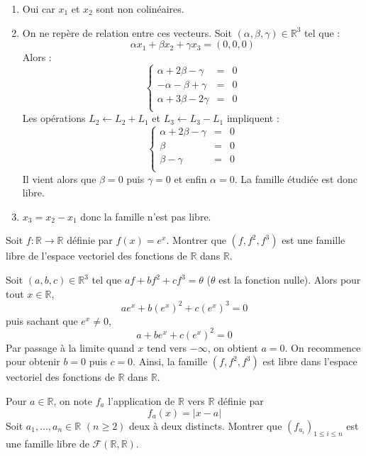\documentclass[a4paper,10pt]{report}
\begin{document}
\begin{enumerate}
\item Oui car $x_1$ et $x_2$ sont non colinéaires.
\item On ne repère de relation entre ces vecteurs. Soit $(\alpha, \beta, \gamma) \in \mathbb{R}^3$ tel que :
$$ \alpha x_1 + \beta x_2 + \gamma x_3 = (0,0,0)$$
Alors :
$$ \left\lbrace \begin{array}{ccl}
\alpha + 2 \beta - \gamma & = & 0 \\
- \alpha - \beta + \gamma & = & 0 \\
\alpha+ 3 \beta -2 \gamma & = & 0 \\
\end{array}\right.$$
Les opérations $L_2 \leftarrow L_2+L_1$ et $L_3 \leftarrow L_3- L_1$ impliquent :
$$ \left\lbrace \begin{array}{rcl}
\alpha + 2 \beta - \gamma & = & 0 \\
  \beta & = & 0 \\
  \beta - \gamma & = & 0 \\
\end{array}\right.$$
Il vient alors que $\beta=0$ puis $\gamma=0$ et enfin $\alpha=0$. La famille étudiée est donc libre.
\item $x_3=x_2-x_1$ donc la famille n'est pas libre.
\end{enumerate}

\medskip


\begin{Exa} Soit $f : \mathbb{R} \rightarrow \mathbb{R}$ définie par $f(x)=e^x$. Montrer que $(f,f^2,f^3)$ est une famille libre de l'espace vectoriel des fonctions de $\mathbb{R}$ dans $\mathbb{R}$.
\end{Exa}

\corr Soit $(a,b,c) \in \mathbb{R}^3$ tel que $af+bf^2+cf^3 = \theta$ ($\theta$ est la fonction nulle). Alors pour tout $x \in \mathbb{R}$,
$$ a e^x+ b (e^x)^2 + c(e^x)^3 = 0 $$
puis sachant que $e^x \neq 0$,
$$ a + be^x + c (e^x)^2 = 0$$
Par passage à la limite quand $x$ tend vers $- \infty$, on obtient $a=0$. On recommence pour obtenir $b=0$ puis $c=0$. Ainsi, la famille $(f,f^2,f^3)$ est libre dans l'espace vectoriel des fonctions de $\mathbb{R}$ dans $\mathbb{R}$.

\medskip

\begin{Exa} Pour $a \in \mathbb{R}$, on note $f_a$ l'application de $\mathbb{R}$ vers $\mathbb{R}$ définie par 
$$f_a(x) = \vert x - a \vert$$
Soit $a_1, \ldots, a_n \in \mathbb{R}$ $(n \geq 2)$ deux à deux distincts. Montrer que $(f_{a_i})_{1 \leq i \leq n}$ est une famille libre de $\mathcal{F}(\mathbb{R}, \mathbb{R})$.
\end{Exa} 
\end{document}
